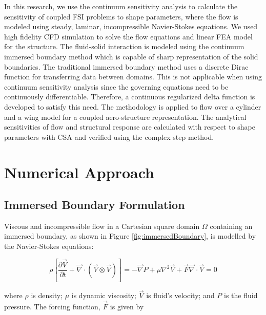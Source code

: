 \documentclass[12pt]{aiaa-pretty}
\begin{document}
In this research, we use the continuum sensitivity analysis to calculate the sensitivity of coupled FSI problems to shape parameters, where the flow is modeled using steady, laminar, incompressible Navier-Stokes equations. We used high fidelity CFD simulation to solve the flow equations and linear FEA model for the structure. The fluid-solid interaction is modeled using the continuum immersed boundary method which is capable of sharp representation of the solid boundaries. The traditional immersed boundary method uses a discrete Dirac function for transferring data between domains. This is not applicable when using continuum sensitivity analysis since the governing equations need to be continuously differentiable. Therefore, a continuous regularized delta function is developed to satisfy this need. The methodology is applied to flow over a cylinder and a wing model for a coupled aero-structure representation. The analytical sensitivities of flow and structural response are calculated with respect to shape parameters with CSA and verified using the complex step method.

\section{Numerical Approach}
\subsection{Immersed Boundary Formulation}
Viscous and incompressible flow in a Cartesian square domain $\Omega$ containing an immersed boundary, as shown in Figure \eqref{fig:immersedBoundary}, is modelled by the Navier-Stokes equations:

%
\begin{subequations}\label{eq:NS}
\begin{equation}
	\rho \left[
	\frac{\partial \vec{V}}{\partial t} + 
	\vec{\nabla} \cdot \left( \vec{V} \otimes \vec{V} \right) 
	\right] = 
	-\vec{\nabla} P + \mu \nabla^2 \vec{V} + \vec{F}
\end{equation}
\begin{equation}
	\vec{\nabla} \cdot \vec{V} = 0
\end{equation}
\end{subequations}
%

where $\rho$ is density; $\mu$ is dynamic viscosity; $\vec{V}$ is fluid's velocity; and $P$ is the fluid pressure. The forcing function, $\vec{F}$ is given by
\end{document}
